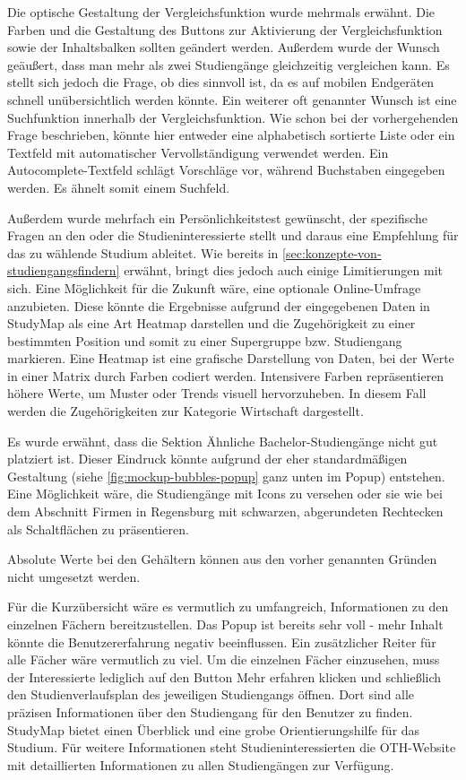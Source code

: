 Die optische Gestaltung der Vergleichsfunktion wurde mehrmals erwähnt. Die Farben und die Gestaltung des Buttons zur Aktivierung der Vergleichsfunktion sowie der Inhaltsbalken sollten geändert werden. Außerdem wurde der Wunsch geäußert, dass man mehr als zwei Studiengänge gleichzeitig vergleichen kann. Es stellt sich jedoch die Frage, ob dies sinnvoll ist, da es auf mobilen Endgeräten schnell unübersichtlich werden könnte. Ein weiterer oft genannter Wunsch ist eine Suchfunktion innerhalb der Vergleichsfunktion. Wie schon bei der vorhergehenden Frage beschrieben, könnte hier entweder eine alphabetisch sortierte Liste oder ein Textfeld mit automatischer Vervollständigung verwendet werden. Ein Autocomplete-Textfeld schlägt Vorschläge vor, während Buchstaben eingegeben werden. Es ähnelt somit einem Suchfeld.

Außerdem wurde mehrfach ein Persönlichkeitstest gewünscht, der spezifische Fragen an den oder die Studieninteressierte stellt und daraus eine Empfehlung für das zu wählende Studium ableitet. Wie bereits in \autoref{sec:konzepte-von-studiengangsfindern} erwähnt, bringt dies jedoch auch einige Limitierungen mit sich. Eine Möglichkeit für die Zukunft wäre, eine optionale Online-Umfrage anzubieten. Diese könnte die Ergebnisse aufgrund der eingegebenen Daten in StudyMap als eine Art Heatmap darstellen und die Zugehörigkeit zu einer bestimmten Position und somit zu einer Supergruppe bzw. Studiengang markieren. Eine Heatmap ist eine grafische Darstellung von Daten, bei der Werte in einer Matrix durch Farben codiert werden. Intensivere Farben repräsentieren höhere Werte, um Muster oder Trends visuell hervorzuheben. In diesem Fall werden die Zugehörigkeiten zur Kategorie \glqq Wirtschaft\grqq{} dargestellt. 

Es wurde erwähnt, dass die Sektion \glqq Ähnliche Bachelor-Studiengänge\grqq{} nicht gut platziert ist. Dieser Eindruck könnte aufgrund der eher standardmäßigen Gestaltung (siehe \autoref{fig:mockup-bubbles-popup} ganz unten im Popup) entstehen. Eine Möglichkeit wäre, die Studiengänge mit Icons zu versehen oder sie wie bei dem Abschnitt \glqq Firmen in Regensburg\grqq{} mit schwarzen, abgerundeten Rechtecken als Schaltflächen zu präsentieren.

Absolute Werte bei den Gehältern können aus den vorher genannten Gründen nicht umgesetzt werden.

Für die Kurzübersicht wäre es vermutlich zu umfangreich, Informationen zu den einzelnen Fächern bereitzustellen. Das Popup ist bereits sehr voll - mehr Inhalt könnte die Benutzererfahrung negativ beeinflussen. Ein zusätzlicher Reiter für alle Fächer wäre vermutlich zu viel. Um die einzelnen Fächer einzusehen, muss der Interessierte lediglich auf den Button \glqq Mehr erfahren\grqq{} klicken und schließlich den Studienverlaufsplan des jeweiligen Studiengangs öffnen. Dort sind alle präzisen Informationen über den Studiengang für den Benutzer zu finden. StudyMap bietet einen Überblick und eine grobe Orientierungshilfe für das Studium. Für weitere Informationen steht Studieninteressierten die OTH-Website mit detaillierten Informationen zu allen Studiengängen zur Verfügung.

